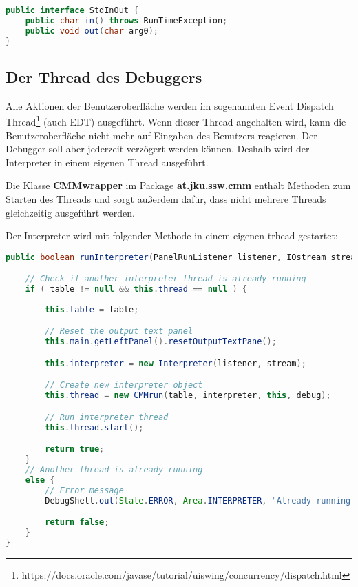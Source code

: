 \begin{lstlisting}[language=JAVA]
public interface StdInOut {
	public char in() throws RunTimeException;
	public void out(char arg0);
}
\end{lstlisting}


\subsection{Der Thread des Debuggers}
Alle Aktionen der Benutzeroberfläche werden im sogenannten Event Dispatch Thread\footnote{https://docs.oracle.com/javase/tutorial/uiswing/concurrency/dispatch.html} (auch EDT) ausgeführt. Wenn dieser Thread angehalten wird, kann die Benutzeroberfläche nicht mehr auf Eingaben des Benutzers reagieren. Der Debugger soll aber jederzeit verzögert werden können. Deshalb wird der Interpreter in einem eigenen Thread ausgeführt.

Die Klasse \textbf{CMMwrapper} im Package \textbf{at.jku.ssw.cmm} enthält Methoden zum Starten des Threads und sorgt außerdem dafür, dass nicht mehrere Threads gleichzeitig ausgeführt werden.

Der Interpreter wird mit folgender Methode in einem eigenen trhead gestartet:
\begin{lstlisting}[language=JAVA]
public boolean runInterpreter(PanelRunListener listener, IOstream stream, Tab table) {

	// Check if another interpreter thread is already running
	if ( table != null && this.thread == null ) {
			
		this.table = table;

		// Reset the output text panel
		this.main.getLeftPanel().resetOutputTextPane();

		this.interpreter = new Interpreter(listener, stream);

		// Create new interpreter object
		this.thread = new CMMrun(table, interpreter, this, debug);

		// Run interpreter thread
		this.thread.start();

		return true;
	}
	// Another thread is already running
	else {
		// Error message
		DebugShell.out(State.ERROR, Area.INTERPRETER, "Already running or not compiled!");

		return false;
	}
}
\end{lstlisting}

